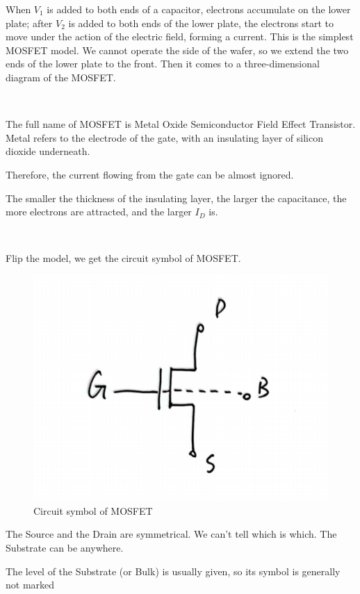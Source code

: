 \documentclass[fontset=windows]{article}
\begin{document}
When $V_1$ is added to both ends of a capacitor, electrons accumulate on the lower plate;
after $V_2$ is added to both ends of the lower plate, the electrons start to move under the action of the electric field, forming a current.
This is the simplest MOSFET model. We cannot operate the side of the wafer, so we extend the two ends of the lower plate to the front.
Then it comes to a three-dimensional diagram of the MOSFET.

\

The full name of MOSFET is Metal Oxide Semiconductor Field Effect Transistor.
Metal refers to the electrode of the gate, with an insulating layer of silicon dioxide underneath.

Therefore, the current flowing from the gate can be almost ignored.

The smaller the thickness of the insulating layer, the larger the capacitance, the more electrons are attracted, and the larger $I_D$ is.

\

Flip the model, we get the circuit symbol of MOSFET.

\begin{figure}[htbp]
    \centering
    \includegraphics[scale=0.6]{2.jpg}
    \captionsetup{labelformat=empty}
    \caption{Circuit symbol of MOSFET}
    \label{2}
\end{figure}

The Source and the Drain are symmetrical. We can't tell which is which. The Substrate can be anywhere.

The level of the Substrate (or Bulk) is usually given, so its symbol is generally not marked
\end{document}
